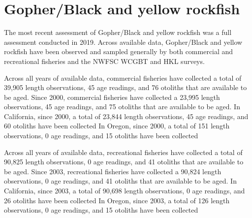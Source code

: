 \documentclass[11pt,
  english,
  letterpaper,
]{article}
\begin{document}

\hypertarget{gopherblack-and-yellow-rockfish}{%
\section{Gopher/Black and yellow rockfish}\label{gopherblack-and-yellow-rockfish}}

\leavevmode\tagmcend\tagstructend


The most recent assessment of Gopher/Black and yellow rockfish was a full assessment conducted in 2019. Across available data, Gopher/Black and yellow rockfish have been observed and sampled generally by both commercial and recreational fisheries and the NWFSC WCGBT and HKL surveys.

\leavevmode\tagmcend\tagstructend\par


Across all years of available data, commercial fisheries have collected a total of 39,905 length observations, 45 age readings, and 76 otoliths that are available to be aged. Since 2000, commercial fisheries have collected a 23,995 length observations, 45 age readings, and 75 otoliths that are available to be aged. In California, since 2000, a total of 23,844 length observations, 45 age readings, and 60 otoliths have been collected In Oregon, since 2000, a total of 151 length observations, 0 age readings, and 15 otoliths have been collected

\leavevmode\tagmcend\tagstructend\par


Across all years of available data, recreational fisheries have collected a total of 90,825 length observations, 0 age readings, and 41 otoliths that are available to be aged. Since 2003, recreational fisheries have collected a 90,824 length observations, 0 age readings, and 41 otoliths that are available to be aged. In California, since 2003, a total of 90,698 length observations, 0 age readings, and 26 otoliths have been collected In Oregon, since 2003, a total of 126 length observations, 0 age readings, and 15 otoliths have been collected

\leavevmode\tagmcend\tagstructend\par

\end{document}
